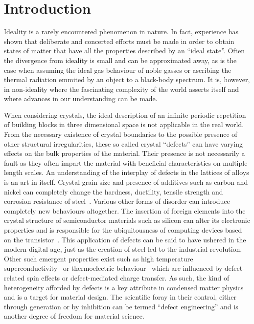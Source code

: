 
\section{Introduction}

Ideality is a rarely encountered phenomenon in nature. In fact,
experience has shown that deliberate and concerted efforts 
must be made in order to obtain states of matter that have all
the properties described by an ``ideal state''.
Often the divergence from ideality is small and can be approximated 
away, as is the case when assuming the ideal gas behaviour 
of noble gasses or ascribing the thermal radiation emmited by an object
to a black-body spectrum. It is, however, in non-ideality where the 
fascinating complexity of the world asserts itself and where 
advances in our understanding can be made. 

When considering crystals, the ideal description of an infinite
periodic repetition of building blocks in three dimensional space is
not applicable in the real world. From the necessary existence of 
crystal boundaries to the possible presence of other structural
irregularities, these so called crystal ``defects'' can have
varying effects on the bulk properties of the material.
Their presence is not necessarily a fault as
they often impart the material with beneficial characteristics
on multiple length scales.
An understanding of the interplay of defects in the 
lattices of alloys is an art in itself.
Crystal grain size and presence of additives such as 
carbon and nickel can completely change the hardness, 
ductility, tensile strength and corrosion resistance
of steel~\cite{reed-hillPhysicalMetallurgyPrinciples1992}. 
Various other forms 
of disorder can introduce completely new behaviours altogether.
The insertion of foreign elements into the crystal structure
of semiconductor materials such as silicon can alter its 
electronic properties and is responsible for the ubiquitousness
of computing devices based on the 
transistor~\cite{levyMicroelectronicMaterialsProcesses1989}. This application
of defects can be said to have ushered in the modern digital age,
just as the creation of steel led to the industrial revolution.
Other such emergent properties exist such as high temperature 
superconductivity~\cite{leggettWhatWeKnow2006} or thermoelectric 
behaviour~\cite{peiBandEngineeringThermoelectric2012} which are influenced
by defect-related spin effects or defect-mediated charge transfer.
As such, the kind of heterogeneity afforded by defects is a key attribute 
in condensed matter physics and is a target for material design.
The scientific foray in their control, either through generation or
by inhibition can be termed ``defect engineering'' and is
another degree of freedom for material science.

